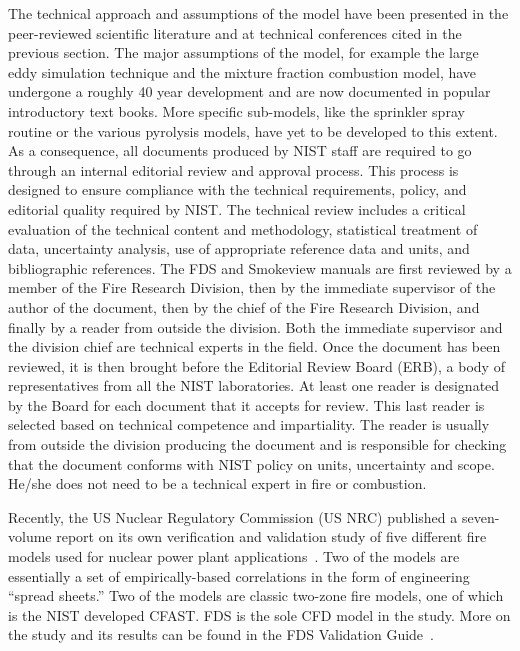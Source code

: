 \documentclass[11pt]{book}
\begin{document}
\label{JustAA}
The technical approach and assumptions of the model have been presented in
the peer-reviewed scientific literature and at technical conferences cited in the previous section.
The major assumptions of the model, for example the large eddy simulation technique and the mixture fraction combustion
model, have undergone a roughly 40 year development and are now documented in popular introductory text books.
More specific sub-models, like the sprinkler spray routine or the various pyrolysis models, have yet to be developed to
this extent. As a consequence, all documents produced by NIST staff are required to go
through an internal editorial review and approval process.
This process is designed to ensure compliance with the technical requirements,
policy, and editorial quality required by NIST.
The technical review includes a critical evaluation of the technical content and
methodology, statistical treatment of data, uncertainty analysis, use of appropriate
reference data and units, and bibliographic references.
The FDS and Smokeview manuals are first reviewed by a member of the Fire Research Division,
then by the immediate supervisor of the author of the document,
then by the chief of the Fire Research Division, and finally by a reader from
outside the division. Both the immediate supervisor and the division chief are
technical experts in the field. Once the document has been reviewed, it is
then brought before the Editorial Review Board (ERB),
a body of representatives from all the NIST laboratories.
At least one reader is designated by the Board for each document that it accepts for
review. This last reader is selected based on technical competence and impartiality.
The reader is usually from outside the division producing the document and is
responsible for checking that the document conforms with NIST policy on units, uncertainty
and scope. He/she does not need to be a technical expert in fire or combustion.

Recently, the US Nuclear Regulatory Commission (US NRC) published a seven-volume report on its own verification and validation
study of five different fire models used for nuclear power plant applications~\cite{NUREG_1824}. Two of the models are essentially a set
of empirically-based correlations in the form of engineering ``spread sheets.'' Two of the models are classic two-zone fire models, one of which
is the NIST developed CFAST. FDS is the sole CFD model in the study. More on the study and its results can be found in the
FDS Validation Guide~\cite{FDS_VV_Guide_5}.
\end{document}

